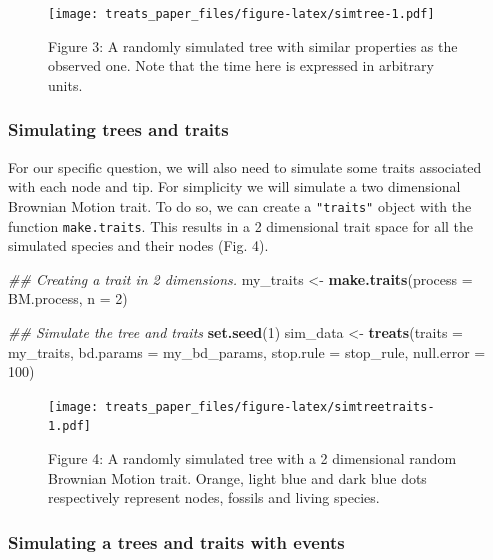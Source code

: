 \documentclass[
]{article}
\newenvironment{Shaded}{\begin{snugshade}}{\end{snugshade}}
\newcommand{\CommentTok}[1]{\textcolor[rgb]{0.56,0.35,0.01}{\textit{#1}}}
\newcommand{\DataTypeTok}[1]{\textcolor[rgb]{0.13,0.29,0.53}{#1}}
\newcommand{\DecValTok}[1]{\textcolor[rgb]{0.00,0.00,0.81}{#1}}
\newcommand{\KeywordTok}[1]{\textcolor[rgb]{0.13,0.29,0.53}{\textbf{#1}}}
\newcommand{\NormalTok}[1]{#1}
\newcommand{\StringTok}[1]{\textcolor[rgb]{0.31,0.60,0.02}{#1}}
\begin{document}
\begin{figure}
\centering
\texttt{[image: treats\_paper\_files/figure-latex/simtree-1.pdf]}
\caption{Figure 3: A randomly simulated tree with similar properties as
the observed one. Note that the time here is expressed in arbitrary
units.}
\end{figure}

\hypertarget{simulating-trees-and-traits}{%
\subsubsection{Simulating trees and
traits}\label{simulating-trees-and-traits}}

For our specific question, we will also need to simulate some traits
associated with each node and tip. For simplicity we will simulate a two
dimensional Brownian Motion trait. To do so, we can create a
\texttt{"traits"} object with the function \texttt{make.traits}. This
results in a 2 dimensional trait space for all the simulated species and
their nodes (Fig. 4).

\begin{Shaded}
\begin{Highlighting}[]
\CommentTok{\#\# Creating a trait in 2 dimensions.}
\NormalTok{my\_traits \textless{}{-}}\StringTok{ }\KeywordTok{make.traits}\NormalTok{(}\DataTypeTok{process =}\NormalTok{ BM.process, }\DataTypeTok{n =} \DecValTok{2}\NormalTok{)}

\CommentTok{\#\# Simulate the tree and traits}
\KeywordTok{set.seed}\NormalTok{(}\DecValTok{1}\NormalTok{)}
\NormalTok{sim\_data \textless{}{-}}\StringTok{ }\KeywordTok{treats}\NormalTok{(}\DataTypeTok{traits     =}\NormalTok{ my\_traits,}
                   \DataTypeTok{bd.params  =}\NormalTok{ my\_bd\_params,}
                   \DataTypeTok{stop.rule  =}\NormalTok{ stop\_rule,}
                   \DataTypeTok{null.error =} \DecValTok{100}\NormalTok{)}
\end{Highlighting}
\end{Shaded}

\begin{figure}
\centering
\texttt{[image: treats\_paper\_files/figure-latex/simtreetraits-1.pdf]}
\caption{Figure 4: A randomly simulated tree with a 2 dimensional random
Brownian Motion trait. Orange, light blue and dark blue dots
respectively represent nodes, fossils and living species.}
\end{figure}

\hypertarget{simulating-a-trees-and-traits-with-events}{%
\subsubsection{Simulating a trees and traits with
events}\label{simulating-a-trees-and-traits-with-events}}
\end{document}
